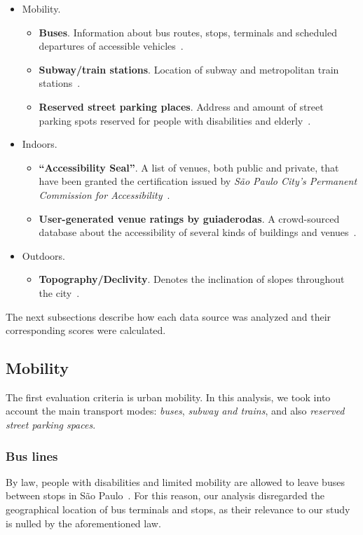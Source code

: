 \documentclass[12pt]{article}
\begin{document}
\begin{itemize}
  \item Mobility.
  \begin{itemize}
    \item \textbf{Buses}.
    Information about bus routes, stops, terminals and scheduled departures of accessible vehicles~\cite{scipopulis, sptrans}.
    \item \textbf{Subway/train stations}.
    Location of subway and metropolitan train stations~\cite{geosampa:2000}.
    \item \textbf{Reserved street parking places}.
    Address and amount of street parking spots reserved for people with disabilities and elderly~\cite{geosampa:2000}.
  \end{itemize}
  \item Indoors.
  \begin{itemize}
    \item \textbf{``Accessibility Seal''}.
    A list of venues, both public and private, that have been granted the certification issued by \emph{São Paulo City's Permanent Commission for Accessibility}~\cite{geosampa:2000}.
    \item \textbf{User-generated venue ratings by guiaderodas}.
    A crowd-sourced database about the accessibility of several kinds of buildings and venues~\cite{guiaderodas}.
  \end{itemize}
  \item Outdoors.
  \begin{itemize}
    \item \textbf{Topography/Declivity}.
    Denotes the inclination of slopes throughout the city~\cite{geosampa:2000}.
  \end{itemize}
\end{itemize}

The next subsections describe how each data source was analyzed and their corresponding scores were calculated.

\subsection{Mobility}
\label{sub:mobility}

The first evaluation criteria is urban mobility.
In this analysis, we took into account the main transport modes:
\textit{buses}, \textit{subway and trains}, and also \textit{reserved street parking spaces}.

\subsubsection{Bus lines}
By law, people with disabilities and limited mobility are allowed to leave buses between stops in São Paulo~\cite{lei-onibus-cadeirante}.
For this reason, our analysis disregarded the geographical location of bus terminals and stops,
as their relevance to our study is nulled by the aforementioned law.
\end{document}
